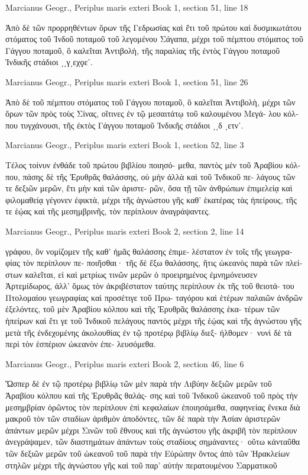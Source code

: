 \documentclass[12pt,letterpaper,twoside,final]{memoir}
\begin{document}
\begin{greek}
Marcianus Geogr., Periplus maris exteri 
Book 1, section 51, line 18

Ἀπὸ δὲ τῶν προρρηθέντων ὅρων τῆς Γεδρωσίας 
καὶ ἔτι τοῦ πρώτου καὶ δυσμικωτάτου στόματος τοῦ 
Ἰνδοῦ ποταμοῦ τοῦ λεγομένου Σάγαπα, μέχρι τοῦ 
πέμπτου στόματος τοῦ Γάγγου ποταμοῦ, ὃ καλεῖται 
Ἀντιβολὴ, τῆς παραλίας τῆς ἐντὸς Γάγγου ποταμοῦ 
Ἰνδικῆς στάδιοι ͵͵γ͵εχϙεʹ. 



Marcianus Geogr., Periplus maris exteri 
Book 1, section 51, line 26

Ἀπὸ δὲ τοῦ πέμπτου στόματος τοῦ Γάγγου ποταμοῦ, 
ὃ καλεῖται Ἀντιβολὴ, μέχρι τῶν ὅρων τῶν πρὸς τοὺς 
Σίνας, οἵτινες ἐν τῷ μεσαιτάτῳ τοῦ καλουμένου Μεγά-
λου κόλπου τυγχάνουσι, τῆς ἐκτὸς Γάγγου ποταμοῦ 
Ἰνδικῆς στάδιοι ͵͵δ ͵ετνʹ. 



Marcianus Geogr., Periplus maris exteri 
Book 1, section 52, line 3

Τέλος τοίνυν ἐνθάδε τοῦ πρώτου βιβλίου ποιησό-
μεθα, παντὸς μὲν τοῦ Ἀραβίου κόλπου, πάσης δὲ τῆς 
Ἐρυθρᾶς θαλάσσης, οὐ μὴν ἀλλὰ καὶ τοῦ Ἰνδικοῦ πε-
λάγους τῶν τε δεξιῶν μερῶν, ἔτι μὴν καὶ τῶν ἀριστε-
ρῶν, ὅσα τῇ τῶν ἀνθρώπων ἐπιμελείᾳ καὶ φιλομαθείᾳ 
γέγονεν ἐφικτὰ, μέχρι τῆς ἀγνώστου γῆς καθ' ἑκατέρας 
τὰς ἠπείρους, τῆς τε ἑῴας καὶ τῆς μεσημβρινῆς, τὸν 
περίπλουν ἀναγράψαντες. 



Marcianus Geogr., Periplus maris exteri 
Book 2, section 2, line 14

γράφου, ὃν νομίζομεν τῆς καθ' ἡμᾶς θαλάσσης ἐπιμε-
λέστατον ἐν τοῖς τῆς γεωγραφίας τὸν περίπλουν πε-
ποιῆσθαι· τῆς δὲ ἔξω θαλάσσης, ἥτις ὠκεανὸς παρὰ 
τῶν πλείστων καλεῖται, εἰ καὶ μετρίως τινῶν μερῶν 
ὁ προειρημένος ἐμνημόνευσεν Ἀρτεμίδωρος, ἀλλ' ὅμως 
τὸν ἀκριβέστατον ταύτης περίπλουν ἐκ τῆς τοῦ θειοτά-
του Πτολομαίου γεωγραφίας καὶ προσέτιγε τοῦ Πρω-
ταγόρου καὶ ἑτέρων παλαιῶν ἀνδρῶν ἐξελόντες, τοῦ 
μὲν Ἀραβίου κόλπου καὶ τῆς Ἐρυθρᾶς θαλάσσης ἑκα-
τέρων τῶν ἠπείρων καὶ ἔτι γε τοῦ Ἰνδικοῦ πελάγους 
παντὸς μέχρι τῆς ἑῴας καὶ τῆς ἀγνώστου γῆς μετὰ 
τῆς ἐνδεχομένης ἀκολουθίας ἐν τῷ προτέρῳ βιβλίῳ διεξ-
ήλθομεν· νυνὶ δὲ τὰ περὶ τὸν ἑσπέριον ὠκεανὸν ἐπε-
λευσόμεθα. 



Marcianus Geogr., Periplus maris exteri 
Book 2, section 46, line 6

                                                  Ὥσπερ δὲ 
ἐν τῷ προτέρῳ βιβλίῳ τῶν μὲν παρὰ τὴν Λιβύην δεξιῶν 
μερῶν τοῦ Ἀραβίου κόλπου καὶ τῆς Ἐρυθρᾶς θαλάς-
σης καὶ τοῦ Ἰνδικοῦ ὠκεανοῦ τοῦ πρὸς τὴν μεσημβρίαν 
ὁρῶντος τὸν περίπλουν ἐπὶ κεφαλαίων ἐποιησάμεθα, 
σαφηνείας ἕνεκα διὰ μακροῦ τὸν τῶν σταδίων ἀριθμὸν 
ἀποδόντες, τῶν δὲ παρὰ τὴν Ἀσίαν ἀριστερῶν ἁπάντων 
μερῶν μέχρι Σινῶν τοῦ ἔθνους καὶ τῆς ἀγνώστου γῆς 
ἀκριβῆ τὸν περίπλουν ἀνεγράψαμεν, τῶν διαστημάτων 
ἁπάντων τοὺς σταδίους σημάναντες· οὕτω κἀνταῦθα 
τῶν δεξιῶν μερῶν τοῦ ὠκεανοῦ τοῦ παρὰ τὴν Εὐρώπην 
ὄντος ἀπὸ τῶν Ἡρακλείων στηλῶν μέχρι τῆς ἀγνώστου 
γῆς καὶ τοῦ παρ' αὐτὴν περατουμένου Σαρματικοῦ 





\end{greek}
\end{document}
